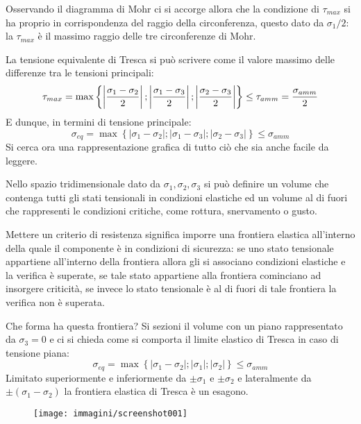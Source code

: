 \documentclass{article}
\begin{document}
\begin{adjustwidth}{2in}{}
	 	Osservando il diagramma di Mohr ci si accorge allora che la condizione di $\tau_{max}$ si ha proprio in corrispondenza del raggio della circonferenza, questo dato da $\sigma_1/2$: la $\tau_{max}$ è il massimo raggio delle tre circonferenze di Mohr. \newline 
	 	
	 	La tensione equivalente di Tresca si può scrivere come il valore massimo delle differenze tra le tensioni principali:
	 	\[\tau_{max} = \max \left\{ \left|\sigma_1-\sigma_2\over 2\right|; \left|\sigma_1-\sigma_3\over 2\right|;      \left|\sigma_2-\sigma_3\over 2\right|\right\} \leq \tau_{amm} = {\sigma_{amm}\over2}\]
	 	E dunque, in termini di tensione principale: 
	 	\[\sigma_{eq} = \max \left\{ \left|\sigma_1-\sigma_2\right|; \left|\sigma_1-\sigma_3\right|;      \left|\sigma_2-\sigma_3\right|\right\} \leq \sigma_{amm}\]
	 	Si cerca ora una rappresentazione grafica di tutto ciò che sia anche facile da leggere. 
	 	
	 	Nello spazio tridimensionale dato da $\sigma_1, \sigma_2, \sigma_3$ si può definire un volume che contenga tutti gli stati tensionali in condizioni elastiche ed un volume al di fuori che rappresenti le condizioni critiche, come rottura, snervamento o gusto. \newline 
	 	
	 	Mettere un criterio di resistenza significa imporre una frontiera elastica all'interno della quale il componente è in condizioni di sicurezza: se uno stato tensionale appartiene all'interno della frontiera allora gli si associano condizioni elastiche e la verifica è superate, se tale stato appartiene alla frontiera cominciano ad insorgere criticità, se invece lo stato tensionale è al di fuori di tale frontiera la verifica non è superata. 
	 	
	 	Che forma ha questa frontiera? Si sezioni il volume con un piano rappresentato da $\sigma_3=0$ e ci si chieda come si comporta il limite elastico di Tresca in caso di tensione piana:
	 	\[\sigma_{eq} = \max \left\{ \left|\sigma_1-\sigma_2\right|; \left|\sigma_1\right|;      \left|\sigma_2\right|\right\} \leq \sigma_{amm}\]
	 	Limitato superiormente e inferiormente da $\pm\sigma_1$ e $\pm\sigma_2$ e lateralmente da $\pm(\sigma_1-\sigma_2)$ la frontiera elastica di Tresca è un esagono.
	 	
	 	\begin{figure}[H]
	 		\centering
	 		\texttt{[image: immagini/screenshot001]}
	 		\label{fig:screenshot001}
	 	\end{figure}
	 	 	

\end{adjustwidth}
\end{document}
